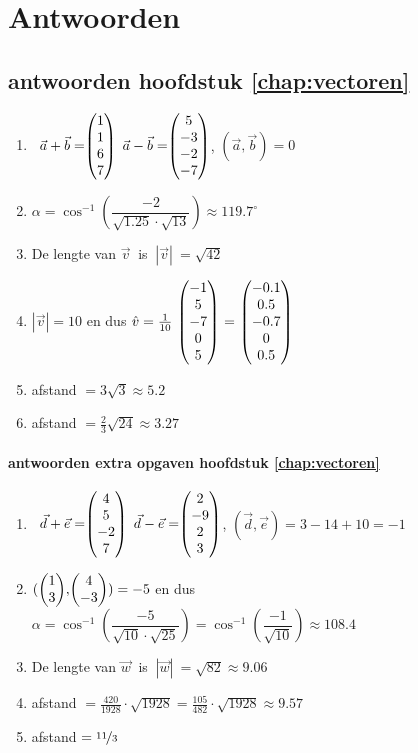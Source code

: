\chapter{Antwoorden}

\section{antwoorden  hoofdstuk \ref{chap:vectoren}}
\begin{enumerate}
	\item   \ $ \vec{a} + \vec{b}  = \vecvier{1}{1}{6}{7} $   \qquad $ \vec{a} - \vec{b} = \vecvier{5}{-3}{-2}{-7} $,   \qquad $  (\vec{a} , \vec{b}) = 0 $ 
	
	
	\item  $\alpha = \cos ^{-1} \left(\dfrac{-2}{\sqrt{1.25}\cdot\sqrt{13}}\right) \approx 119.7^\circ $ 
	
	\item De lengte van  $  \vec{v} \ $ is $ \ |\vec{v}| \  =  \sqrt{42}$
	
	\item $|\vec{v}| = 10$ en dus $ \hat{v} = \frac{1}{10}\  \vecvijf{-1}{5}{-7}{0}{5} \  = \  \vecvijf{-0.1}{0.5}{-0.7}{0}{0.5} $
	
	\item afstand  $ = 3\sqrt{3} \approx 5.2 $

    \item afstand  $ = \frac{2}{3}\sqrt{24} \approx 3.27 $
\end{enumerate}

\subsubsection{antwoorden extra opgaven hoofdstuk \ref{chap:vectoren}}
\begin{enumerate}
	
	\item  \ $ \vec{d} + \vec{e}  = \vecvier{4}{5}{-2}{7} $   \qquad $ \vec{d} - \vec{e} = \vecvier{2}{-9}{2}{3} $,   \qquad $  (\vec{d} , \vec{e}) = 3-14+10 = -1 $ 
	
	\item $  (\vectwee{1}{3} , \vectwee{4}{-3}) = -5 $  en dus $\alpha = \cos ^{-1} \left(\dfrac{-5}{\sqrt{10}\cdot\sqrt{25}}\right)= \cos ^{-1} \left(\dfrac{-1}{\sqrt{10}}\right) \approx 108.4 $ 
	
	\item De lengte van  $  \vec{w} \ $ is $ \ |\vec{w}| \  =  \sqrt{82} \approx 9.06 $
	
	\item afstand  $ = \frac{420}{1928}\cdot\sqrt{1928} = \frac{105}{482}\cdot\sqrt{1928} \approx 9.57 $
	
	\item    afstand  $ = \nicefrac{11}{3} $
\end{enumerate}	

